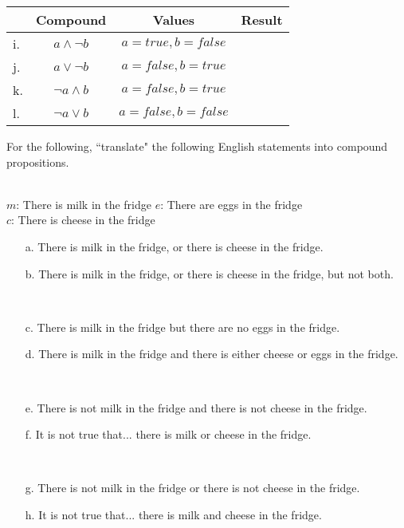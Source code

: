         \begin{tabular}{ | l  c | c | p{6cm} | }
            \hline
            & \textbf{Compound} & \textbf{Values} & \textbf{Result}
            \\ \hline

            i. &        $a \land \neg b$ &       $a = true, b = false$ &   \\ \hline
            j. &        $a \lor \neg b$ &        $a = false, b = true$ &   \\ \hline

            k. &        $\neg a \land b$ &       $a = false, b = true$ &   \\ \hline
            l. &        $\neg a \lor b$ &        $a = false, b = false$ &  \\ \hline
        \end{tabular}

    \newpage

    \begin{questionNOGRADE}{\thequestion}
        For the following, ``translate" the following English statements
        into compound propositions.

        ~\\
        $m$: There is milk in the fridge \tab
        $e$: There are eggs in the fridge \\
        $c$: There is cheese in the fridge


        \begin{enumerate}
            \item[a.]   There is milk in the fridge, or there is cheese in the fridge.
            \item[b.]   There is milk in the fridge, or there is cheese in the fridge, but not both.

            ~\\
            \item[c.]   There is milk in the fridge but there are no eggs in the fridge.
            \item[d.]   There is milk in the fridge and there is either cheese or eggs in the fridge.

            ~\\
            \item[e.]   There is not milk in the fridge and there is not cheese in the fridge.
            \item[f.]   It is not true that... there is milk or cheese in the fridge.

            ~\\
            \item[g.]   There is not milk in the fridge or there is not cheese in the fridge.
            \item[h.]   It is not true that... there is milk and cheese in the fridge.
        \end{enumerate}
    \end{questionNOGRADE}

